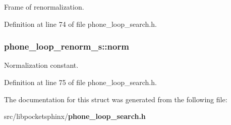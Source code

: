 \-Frame of renormalization. 



\-Definition at line 74 of file phone\-\_\-loop\-\_\-search.\-h.

\subsubsection[{norm}]{ {\bf phone\-\_\-loop\-\_\-renorm\-\_\-s\-::norm}}\label{structphone__loop__renorm__s_a9a76415892efce2e4b53bc5ea6599010}


\-Normalization constant. 



\-Definition at line 75 of file phone\-\_\-loop\-\_\-search.\-h.



\-The documentation for this struct was generated from the following file\-:\begin{DoxyCompactItemize}
\item 
src/libpocketsphinx/{\bf phone\-\_\-loop\-\_\-search.\-h}\end{DoxyCompactItemize}
